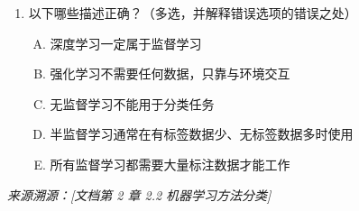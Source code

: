 \documentclass[a4paper,11pt]{ctexart}
\begin{document}
\begin{problembox}
\begin{enumerate}[(1)]
        \item 以下哪些描述正确？（多选，并解释错误选项的错误之处）
        \begin{enumerate}[A.]
            \item 深度学习一定属于监督学习
            \item 强化学习不需要任何数据，只靠与环境交互
            \item 无监督学习不能用于分类任务
            \item 半监督学习通常在有标签数据少、无标签数据多时使用
            \item 所有监督学习都需要大量标注数据才能工作
        \end{enumerate}
    \end{enumerate}
    {\color{gray}\small\textit{来源溯源：[文档第 2 章 2.2 机器学习方法分类]}}
\end{problembox}
\end{document}
